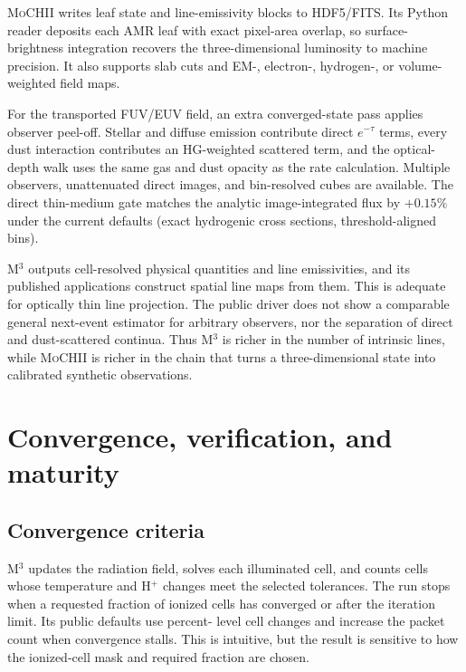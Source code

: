 \documentclass[english,a4paper]{my_memo}
\newcommand{\MoCHII}{\textsc{MoCHII}}
\newcommand{\Mthree}{M$^3$}
\begin{document}
\MoCHII{} writes leaf state and line-emissivity blocks to HDF5/FITS.  Its
Python reader deposits each AMR leaf with exact pixel-area overlap, so
surface-brightness integration recovers the three-dimensional luminosity
to machine precision.  It also supports slab cuts and EM-, electron-,
hydrogen-, or volume-weighted field maps.

For the transported FUV/EUV field, an extra converged-state pass applies
observer peel-off.  Stellar and diffuse emission contribute direct
$e^{-\tau}$ terms, every dust interaction contributes an HG-weighted
scattered term, and the optical-depth walk uses the same gas and dust
opacity as the rate calculation.  Multiple observers, unattenuated direct
images, and bin-resolved cubes are available.  The direct thin-medium gate
matches the analytic image-integrated flux by $+0.15\%$ under the current
defaults (exact hydrogenic cross sections, threshold-aligned bins).

\Mthree{} outputs cell-resolved physical quantities and line emissivities,
and its published applications construct spatial line maps from them.
This is adequate for optically thin line projection.  The public driver
does not show a comparable general next-event estimator for arbitrary
observers, nor the separation of direct and dust-scattered continua.
Thus \Mthree{} is richer in the number of intrinsic lines, while
\MoCHII{} is richer in the chain that turns a three-dimensional state
into calibrated synthetic observations.

\section{Convergence, verification, and maturity}

\subsection{Convergence criteria}

\Mthree{} updates the radiation field, solves each illuminated cell, and
counts cells whose temperature and H$^+$ changes meet the selected
tolerances.  The run stops when a requested fraction of ionized cells has
converged or after the iteration limit.  Its public defaults use percent-
level cell changes and increase the packet count when convergence stalls.
This is intuitive, but the result is sensitive to how the ionized-cell
mask and required fraction are chosen.
\end{document}
